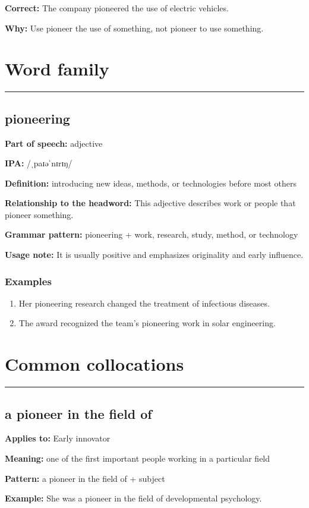 \documentclass[11pt]{article}
\newcommand{\sectionrule}{\par\vspace{-0.5em}\noindent\textcolor{Accent}{\rule{\linewidth}{0.6pt}}\par}
\begin{document}
\textbf{Correct:} The company pioneered the use of electric vehicles.

\textbf{Why:} Use pioneer the use of something, not pioneer to use something.

\section{Word family}
\sectionrule
\subsection{pioneering}
\textbf{Part of speech:} adjective

\textbf{IPA:} /ˌpaɪəˈnɪrɪŋ/

\textbf{Definition:} introducing new ideas, methods, or technologies before most others

\textbf{Relationship to the headword:} This adjective describes work or people that pioneer something.

\textbf{Grammar pattern:} pioneering + work, research, study, method, or technology

\textbf{Usage note:} It is usually positive and emphasizes originality and early influence.

\subsubsection{Examples}
\begin{enumerate}
  \item Her pioneering research changed the treatment of infectious diseases.
  \item The award recognized the team's pioneering work in solar engineering.
\end{enumerate}

\section{Common collocations}
\sectionrule
\subsection{a pioneer in the field of}
\textbf{Applies to:} Early innovator

\textbf{Meaning:} one of the first important people working in a particular field

\textbf{Pattern:} a pioneer in the field of + subject

\textbf{Example:} She was a pioneer in the field of developmental psychology.
\end{document}
